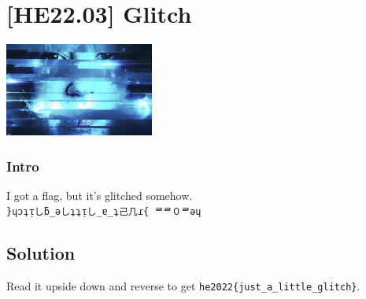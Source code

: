 
\hypertarget{he22.03}{%
\chapter{[HE22.03] Glitch}\label{he22.03}}
\begin{marginfigure}
	\includegraphics[width=49mm]{level2/challenge3.jpg}
\end{marginfigure}
\subsection{Intro}
I got a flag, but it's glitched somehow.\\
\noindent\texttt{\}ɥɔʇᴉ{\NotoJapan し}ƃ\_ǝ{\NotoJapan し}ʇʇᴉ{\NotoJapan し}\_ɐ\_ʇ{\NotoJapan 己几}ɾ\{ {\NotoKorea ᄅᄅ０}{\NotoKorea ᄅ}ǝɥ}


\section{Solution}\label{hv21.03-solution}

Read it upside down and reverse to get
\verb+he2022{just_a_little_glitch}+.
